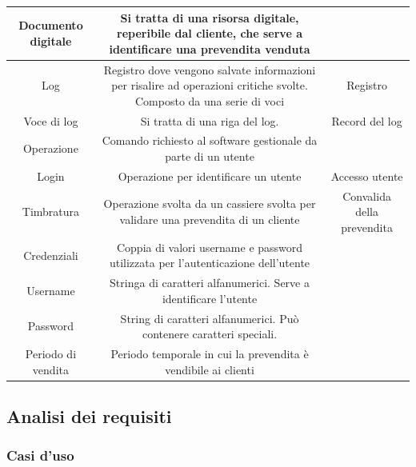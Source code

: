 \documentclass[a4paper]{article}
\begin{document}
\begin{table}[ht!]
\begin{center}
\begin{tabulary}{1\textwidth}{c|C|C}
		\hline
		Documento digitale & Si tratta di una risorsa digitale, reperibile dal cliente, che serve a identificare una prevendita venduta & \\
		\hline
		Log & Registro dove vengono salvate informazioni per risalire ad operazioni critiche svolte. Composto da una serie di voci & Registro \\
		\hline
		Voce di log & Si tratta di una riga del log. & Record del log\\
		\hline
		Operazione & Comando richiesto al software gestionale da parte di un utente & \\
		\hline
		Login & Operazione per identificare un utente & Accesso utente \\
		\hline
		Timbratura & Operazione svolta da un cassiere svolta per validare una prevendita di un cliente & Convalida della prevendita \\
		\hline
		Credenziali & Coppia di valori username e password utilizzata per l'autenticazione dell'utente & \\
		\hline
		Username & Stringa di caratteri alfanumerici. Serve a identificare l'utente & \\
		\hline
		Password & String di caratteri alfanumerici. Può contenere caratteri speciali. & \\
		\hline
		Periodo di vendita & Periodo temporale in cui la prevendita è vendibile ai clienti & \\
		\hline
    \end{tabulary}
  \end{center}
\end{table}

\newpage

\subsection{Analisi dei requisiti}
\subsubsection{Casi d'uso}
\end{document}
